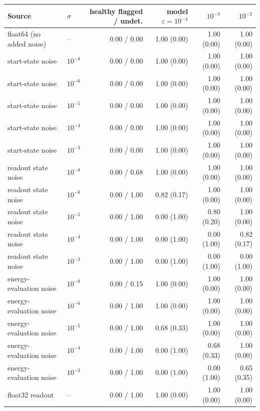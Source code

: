 \begin{tabular}{llrrrr}
\toprule
Source & $\sigma$ & healthy flagged / undet. & model $\varepsilon{=}10^{-4}$ & $10^{-3}$ & $10^{-2}$ \\
\midrule
float64 (no added noise) & -- & 0.00 / 0.00 & 1.00 (0.00) & 1.00 (0.00) & 1.00 (0.00) \\
start-state noise & $10^{-8}$ & 0.00 / 0.00 & 1.00 (0.00) & 1.00 (0.00) & 1.00 (0.00) \\
start-state noise & $10^{-6}$ & 0.00 / 0.00 & 1.00 (0.00) & 1.00 (0.00) & 1.00 (0.00) \\
start-state noise & $10^{-5}$ & 0.00 / 0.00 & 1.00 (0.00) & 1.00 (0.00) & 1.00 (0.00) \\
start-state noise & $10^{-4}$ & 0.00 / 0.00 & 1.00 (0.00) & 1.00 (0.00) & 1.00 (0.00) \\
start-state noise & $10^{-3}$ & 0.00 / 0.00 & 1.00 (0.00) & 1.00 (0.00) & 1.00 (0.00) \\
readout state noise & $10^{-8}$ & 0.00 / 0.68 & 1.00 (0.00) & 1.00 (0.00) & 1.00 (0.00) \\
readout state noise & $10^{-6}$ & 0.00 / 1.00 & 0.82 (0.17) & 1.00 (0.00) & 1.00 (0.00) \\
readout state noise & $10^{-5}$ & 0.00 / 1.00 & 0.00 (1.00) & 0.80 (0.20) & 1.00 (0.00) \\
readout state noise & $10^{-4}$ & 0.00 / 1.00 & 0.00 (1.00) & 0.00 (1.00) & 0.82 (0.17) \\
readout state noise & $10^{-3}$ & 0.00 / 1.00 & 0.00 (1.00) & 0.00 (1.00) & 0.00 (1.00) \\
energy-evaluation noise & $10^{-8}$ & 0.00 / 0.15 & 1.00 (0.00) & 1.00 (0.00) & 1.00 (0.00) \\
energy-evaluation noise & $10^{-6}$ & 0.00 / 1.00 & 1.00 (0.00) & 1.00 (0.00) & 1.00 (0.00) \\
energy-evaluation noise & $10^{-5}$ & 0.00 / 1.00 & 0.68 (0.33) & 1.00 (0.00) & 1.00 (0.00) \\
energy-evaluation noise & $10^{-4}$ & 0.00 / 1.00 & 0.00 (1.00) & 0.68 (0.33) & 1.00 (0.00) \\
energy-evaluation noise & $10^{-3}$ & 0.00 / 1.00 & 0.00 (1.00) & 0.00 (1.00) & 0.65 (0.35) \\
float32 readout & -- & 0.00 / 1.00 & 1.00 (0.00) & 1.00 (0.00) & 1.00 (0.00) \\
\bottomrule
\end{tabular}
